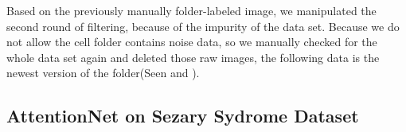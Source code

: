 Based on the previously manually folder-labeled image, we manipulated the second round of filtering, because of the impurity of the data set. Because we do not allow the cell folder contains noise data, so we manually checked for the whole data set again and deleted those raw images, the following data is the newest version of the folder(Seen \eg{} and \eg{}). 



\subsection{AttentionNet on Sezary Sydrome Dataset}

\begin{table}[t]
\end{table}
